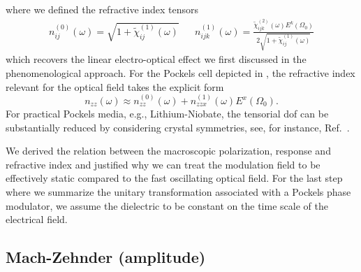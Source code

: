 where we defined the refractive index tensors
\begin{align}
	n^{(0)}_{ij}(\omega)
	=
	\sqrt{1+\tilde{\chi}^{(1)}_{ij}(\omega)}
	&&
	n^{(1)}_{ijk}(\omega)
	=
	\frac{\tilde{\chi}^{(2)}_{ijk}(\omega)
	E^k(\Omega_0)}{2\sqrt{1+\tilde{\chi}^{(1)}_{ij}(\omega)}}
\end{align}
which recovers the linear electro-optical effect we first discussed in the phenomenological approach.
For the Pockels cell depicted in , the refractive index relevant for the optical field takes the explicit form
\begin{equation}
	n_{zz}(\omega)
	\approx
	n^{(0)}_{zz}(\omega)
	+
	n^{(1)}_{zzx}(\omega)
	E^x(\Omega_0)
	.
\end{equation}
For practical Pockels media, e.g., Lithium-Niobate, the tensorial \gls{dof} can be substantially reduced by considering crystal symmetries, see, for instance, Ref.~\cite[p.~237]{Yariv1984}.

We derived the relation between the macroscopic polarization, response and refractive index and justified why we can treat the modulation field to be effectively static compared to the fast oscillating optical field.
For the last step where we summarize the unitary transformation associated with a Pockels phase modulator, we assume the dielectric to be constant on the time scale of the electrical field.

\FloatBarrier
\subsection{Mach-Zehnder (amplitude)}

